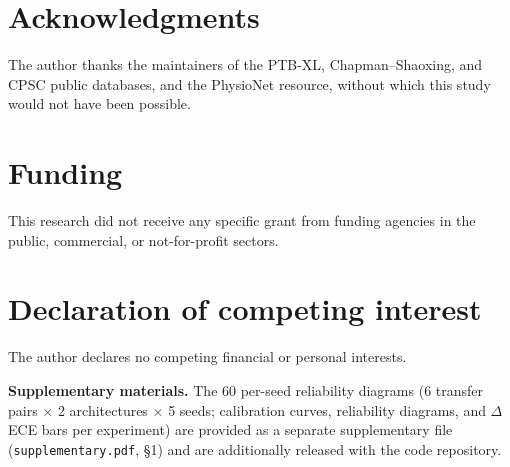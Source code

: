 \documentclass[review,12pt,nonatbib]{elsarticle}
\begin{document}
\section*{Acknowledgments}
The author thanks the maintainers of the PTB-XL, Chapman--Shaoxing,
and CPSC public databases, and the PhysioNet resource, without which
this study would not have been possible.

\section*{Funding}
This research did not receive any specific grant from funding
agencies in the public, commercial, or not-for-profit sectors.

\section*{Declaration of competing interest}
The author declares no competing financial or personal interests.

\textbf{Supplementary materials.} The 60 per-seed reliability diagrams
(6 transfer pairs $\times$ 2 architectures $\times$ 5 seeds; calibration
curves, reliability diagrams, and $\Delta$ECE bars per experiment) are
provided as a separate supplementary file
(\texttt{supplementary.pdf}, \S1) and are additionally released with
the code repository.
\end{document}

